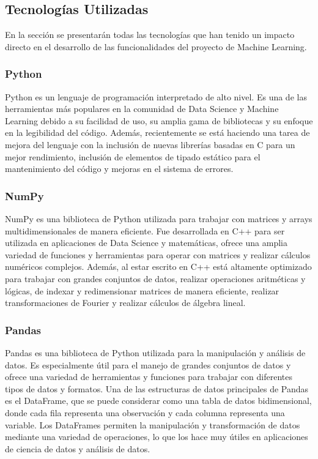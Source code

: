 \subsection{Tecnologías Utilizadas}
En la sección se presentarán todas las tecnologías que han tenido un impacto directo en el desarrollo de las 
funcionalidades del proyecto de Machine Learning.

\subsubsection{Python}
Python \cite{C8d} es un lenguaje de programación interpretado de alto nivel. Es una de las herramientas más populares 
en la comunidad de Data Science y Machine Learning debido a su facilidad de uso, su amplia gama de bibliotecas 
y su enfoque en la legibilidad del código. Además, recientemente se está haciendo una tarea de mejora del 
lenguaje con la inclusión de nuevas librerías basadas en C para un mejor rendimiento, inclusión de elementos 
de tipado estático para el mantenimiento del código y mejoras en el sistema de errores.

\subsubsection{NumPy}
NumPy \cite{Numpy} es una biblioteca de Python utilizada para trabajar con matrices y arrays multidimensionales de manera 
eficiente. Fue desarrollada en C++ para ser utilizada en aplicaciones de Data Science y matemáticas, ofrece 
una amplia variedad de funciones y herramientas para operar con matrices y realizar cálculos numéricos complejos. 
Además, al estar escrito en C++ está altamente optimizado para trabajar con grandes conjuntos de datos, realizar 
operaciones aritméticas y lógicas, de indexar y redimensionar matrices de manera eficiente, realizar transformaciones 
de Fourier y realizar cálculos de álgebra lineal.

\subsubsection{Pandas}
Pandas \cite{pandas} es una biblioteca de Python utilizada para la manipulación y análisis de datos. Es especialmente 
útil para el manejo de grandes conjuntos de datos y ofrece una variedad de herramientas y funciones para 
trabajar con diferentes tipos de datos y formatos. Una de las estructuras de datos principales de Pandas es 
el DataFrame, que se puede considerar como una tabla de datos bidimensional, donde cada fila representa una 
observación y cada columna representa una variable. Los DataFrames permiten la manipulación y transformación 
de datos mediante una variedad de operaciones, lo que los hace muy útiles en aplicaciones de ciencia de datos 
y análisis de datos. 

